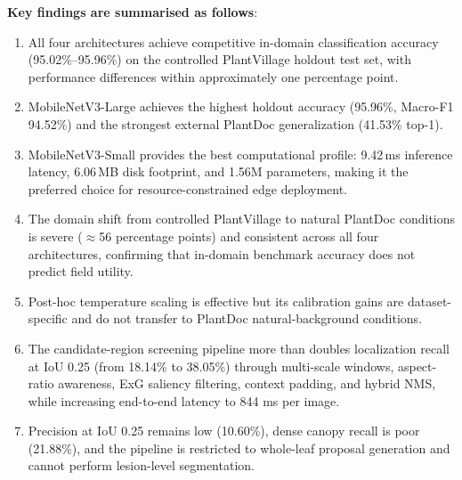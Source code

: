 \documentclass[pdflatex,sn-mathphys-num]{sn-jnl}
\begin{document}
\textbf{Key findings are summarised as follows}:
\begin{enumerate}
  \item All four architectures achieve competitive in-domain classification accuracy
        (95.02\%--95.96\%) on the controlled PlantVillage holdout test set, with
        performance differences within approximately one percentage point.
  \item MobileNetV3-Large achieves the highest holdout accuracy (95.96\%, Macro-F1
        94.52\%) and the strongest external PlantDoc generalization (41.53\% top-1).
  \item MobileNetV3-Small provides the best computational profile: 9.42\,ms inference
        latency, 6.06\,MB disk footprint, and 1.56M parameters, making it the preferred
        choice for resource-constrained edge deployment.
  \item The domain shift from controlled PlantVillage to natural PlantDoc conditions is
        severe ($\approx$56 percentage points) and consistent across all four architectures,
        confirming that in-domain benchmark accuracy does not predict field utility.
  \item Post-hoc temperature scaling is effective but its calibration gains are
        dataset-specific and do not transfer to PlantDoc natural-background conditions.
  \item The candidate-region screening pipeline more than doubles localization recall at
        IoU 0.25 (from 18.14\% to 38.05\%) through multi-scale windows, aspect-ratio
        awareness, ExG saliency filtering, context padding, and hybrid NMS, while
        increasing end-to-end latency to 844 ms per image.
  \item Precision at IoU 0.25 remains low (10.60\%), dense canopy recall is poor
        (21.88\%), and the pipeline is restricted to whole-leaf proposal generation and
        cannot perform lesion-level segmentation.
\end{enumerate}
\end{document}
